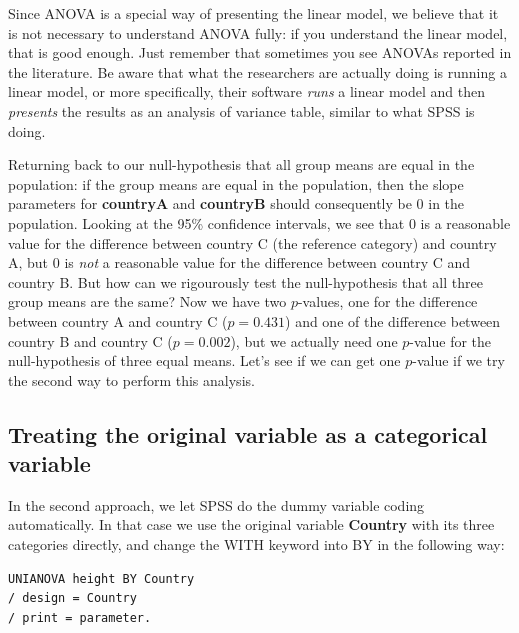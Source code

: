\documentclass[]{report}\usepackage[]{graphicx}\usepackage[]{color}
\begin{document}
Since ANOVA is a special way of presenting the linear model, we believe that it is not necessary to understand ANOVA fully: if you understand the linear model, that is good enough. Just remember that sometimes you see ANOVAs reported in the literature. Be aware that what the researchers are actually doing is running a linear model, or more specifically, their software \textit{runs} a linear model and then \textit{presents} the results as an analysis of variance table, similar to what SPSS is doing.

Returning back to our null-hypothesis that all group means are equal in the population: if the group means are equal in the population, then the slope parameters for \textbf{countryA} and \textbf{countryB} should consequently be 0 in the population. Looking at the 95\% confidence intervals, we see that 0 is a reasonable value for the difference between country C (the reference category) and country A, but 0 is \textit{not} a reasonable value for the difference between country C and country B. But how can we rigourously test the null-hypothesis that all three group means are the same? Now we have two $p$-values, one for the difference between country A and country C ($p=0.431$) and one of the difference between country B and country C ($p=0.002$), but we actually need one $p$-value for the null-hypothesis of three equal means. Let's see if we can get one $p$-value if we try the second way to perform this analysis.




\subsection{Treating the original variable as a categorical variable}

In the second approach, we let SPSS do the dummy variable coding automatically. In that case we use the original variable \textbf{Country} with its three categories directly, and change the WITH keyword into BY in the following way:

\begin{verbatim}
UNIANOVA height BY Country
/ design = Country
/ print = parameter.
\end{verbatim}
\end{document}
